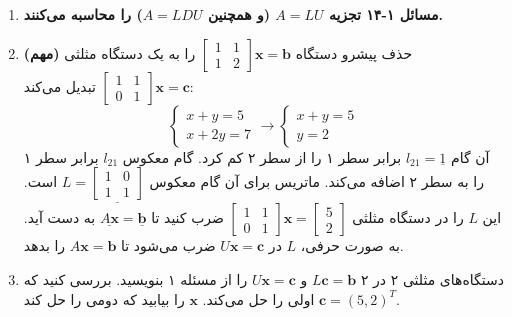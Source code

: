 \documentclass[12pt, a4paper]{book}
\begin{document}
	\begin{enumerate}
		\item[] \textbf{مسائل ۱-۱۴ تجزیه $A = LU$ (و همچنین $A = LDU$) را محاسبه می‌کنند.}
		\item \textbf{(مهم)} حذف پیشرو دستگاه $\begin{bmatrix} 1 & 1 \\ 1 & 2 \end{bmatrix} \mathbf{x} = \mathbf{b}$ را به یک دستگاه مثلثی $\begin{bmatrix} 1 & 1 \\ 0 & 1 \end{bmatrix} \mathbf{x} = \mathbf{c}$ تبدیل می‌کند:
		\[ \begin{cases} x+y=5 \\ x+2y=7 \end{cases} \to \begin{cases} x+y=5 \\ y=2 \end{cases} \]
		آن گام $l_{21} = \underline{1}$ برابر سطر ۱ را از سطر ۲ کم کرد. گام معکوس $l_{21}$ برابر سطر ۱ را به سطر ۲ اضافه می‌کند. ماتریس برای آن گام معکوس $L = \underline{\begin{bmatrix} 1 & 0 \\ 1 & 1 \end{bmatrix}}$ است. این $L$ را در دستگاه مثلثی $\begin{bmatrix} 1 & 1 \\ 0 & 1 \end{bmatrix} \mathbf{x} = \begin{bmatrix} 5 \\ 2 \end{bmatrix}$ ضرب کنید تا $\underline{A\mathbf{x}} = \underline{\mathbf{b}}$ به دست آید. به صورت حرفی، $L$ در $U\mathbf{x}=\mathbf{c}$ ضرب می‌شود تا \underline{$A\mathbf{x}=\mathbf{b}$} را بدهد.
		
		\item دستگاه‌های مثلثی ۲ در ۲ $L\mathbf{c}=\mathbf{b}$ و $U\mathbf{x}=\mathbf{c}$ را از مسئله ۱ بنویسید. بررسی کنید که $\mathbf{c}=(5,2)^T$ اولی را حل می‌کند. $\mathbf{x}$ را بیابید که دومی را حل کند.
		

\end{enumerate}
\end{document}
